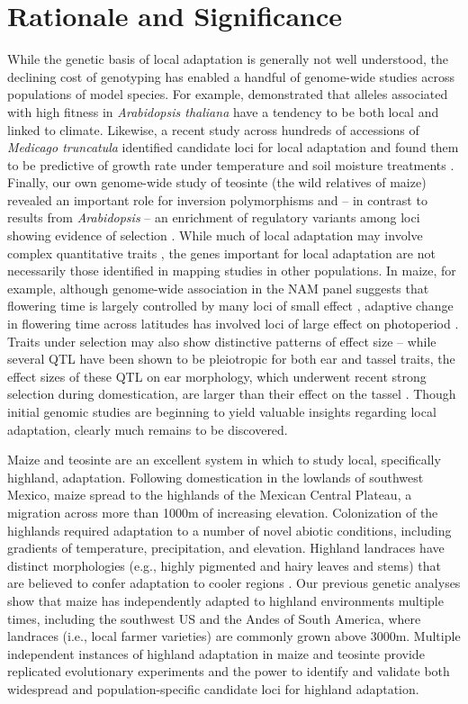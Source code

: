 \section*{Rationale and Significance}

While the genetic basis of local adaptation is generally not well understood, the declining cost of genotyping has enabled a handful of genome-wide studies across populations of model species.  For example, \citet{fournier2011map} demonstrated that alleles associated with high fitness in \emph{Arabidopsis thaliana} have a tendency to be both local and linked to climate.  Likewise, a recent study across hundreds of accessions of \emph{Medicago truncatula} identified candidate loci for local adaptation and found them to be predictive of growth rate under temperature and soil moisture treatments \citep{Yoder17012014}.  Finally, our own genome-wide study of teosinte (the wild relatives of maize) revealed  an important role for inversion polymorphisms and -- in contrast to results from \emph{Arabidopsis} \citep{hancock2011adaptation} -- an enrichment of regulatory variants among loci showing evidence of selection \citep{Pyhajarvi2013}. While much of local adaptation may involve complex quantitative traits \citep{le2012genetic}, the genes important for local adaptation are not necessarily those identified in mapping studies in other populations. In maize, for example, although genome-wide association in the NAM panel suggests that flowering time is largely controlled by many loci of small effect \citep{buckler2009genetic}, adaptive change in flowering time across latitudes has involved loci of large effect on photoperiod \citep{hung2012zmcct}. Traits under selection may also show distinctive patterns of effect size -- while several QTL have been shown to be pleiotropic for both ear and tassel traits, the effect sizes of these QTL on ear morphology, which underwent recent strong selection during domestication, are larger than their effect on the tassel \citep{Brown2011b}. Though initial genomic studies are beginning to yield valuable insights regarding local adaptation, clearly much remains to be discovered.  

Maize and teosinte are an excellent system in which to study local, specifically highland, adaptation.  Following domestication in the lowlands of southwest Mexico, maize spread to the highlands of the Mexican Central Plateau, a migration across more than 1000m of increasing elevation.  Colonization of the highlands required adaptation to a number of novel abiotic conditions, including gradients of temperature, precipitation, and elevation. Highland landraces have distinct morphologies (e.g., highly pigmented and hairy leaves and stems) that are believed to confer adaptation to cooler regions \citep{Doebley1984a}.  Our previous genetic analyses \citep{vanheerwaarden2011a} show that maize has independently adapted to highland environments multiple times, including the southwest US and the Andes of South America, where landraces (i.e., local farmer varieties) are commonly grown above 3000m. Multiple independent instances of highland adaptation in maize and teosinte provide replicated evolutionary experiments and the power to identify and validate both widespread and population-specific candidate loci for highland adaptation.

